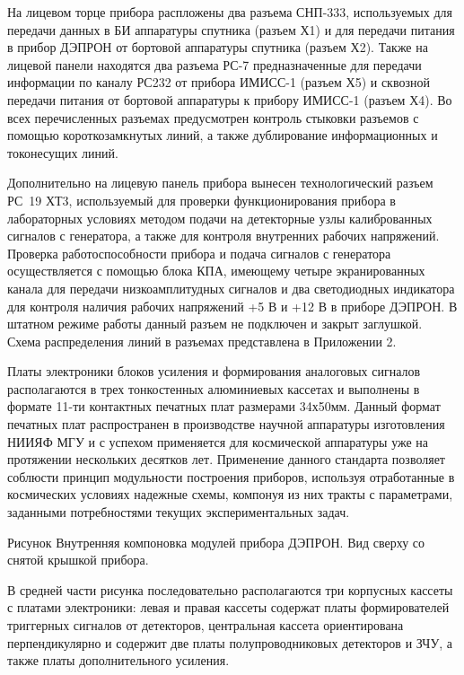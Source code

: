 \documentclass[a4paper,portrait,12pt]{article}
\begin{document}
{{{{На лицевом торце прибора распложены два разъема СНП-333, используемых для передачи данных в БИ аппаратуры спутника (разъем Х1) и для передачи питания в прибор ДЭПРОН от бортовой аппаратуры спутника (разъем Х2). Также на лицевой панели находятся два разъема РС-7 предназначенные для передачи информации по каналу РС232 от прибора ИМИСС-1 (разъем Х5) и сквозной передачи питания от бортовой аппаратуры к прибору ИМИСС-1 (разъем Х4). Во всех перечисленных разъемах предусмотрен контроль стыковки разъемов с помощью короткозамкнутых линий, а также дублирование информационных и токонесущих линий.


Дополнительно на лицевую панель прибора вынесен технологический разъем РС 19 ХТ3, используемый для проверки функционирования прибора в лабораторных условиях методом подачи на детекторные узлы калиброванных сигналов с генератора, а также для контроля внутренних рабочих напряжений. Проверка работоспособности прибора и подача сигналов с генератора осуществляется с помощью  блока КПА, имеющему четыре экранированных канала для передачи низкоамплитудных сигналов и два светодиодных индикатора для контроля наличия рабочих напряжений  +5 В и +12 В в приборе ДЭПРОН. В штатном режиме работы данный разъем не подключен и закрыт заглушкой. Схема распределения линий в разъемах представлена в Приложении 2.


Платы электроники блоков усиления и формирования аналоговых сигналов располагаются в трех тонкостенных алюминиевых кассетах и выполнены в формате 11-ти контактных печатных плат размерами 34х50мм. Данный формат печатных плат распространен в производстве научной аппаратуры изготовления НИИЯФ МГУ и с успехом применяется для космической аппаратуры уже на протяжении нескольких десятков лет. Применение данного стандарта позволяет соблюсти принцип модульности построения приборов, используя отработанные в космических условиях надежные схемы, компонуя из них тракты с параметрами, заданными потребностями текущих экспериментальных задач. 





Рисунок Внутренняя компоновка модулей прибора ДЭПРОН. Вид сверху со снятой крышкой прибора. 


В средней части рисунка последовательно располагаются три корпусных кассеты с платами электроники: левая и правая кассеты содержат платы формирователей триггерных сигналов от детекторов, центральная кассета ориентирована перпендикулярно и содержит две платы полупроводниковых детекторов и ЗЧУ, а также платы дополнительного усиления.


}}}}
\end{document}
